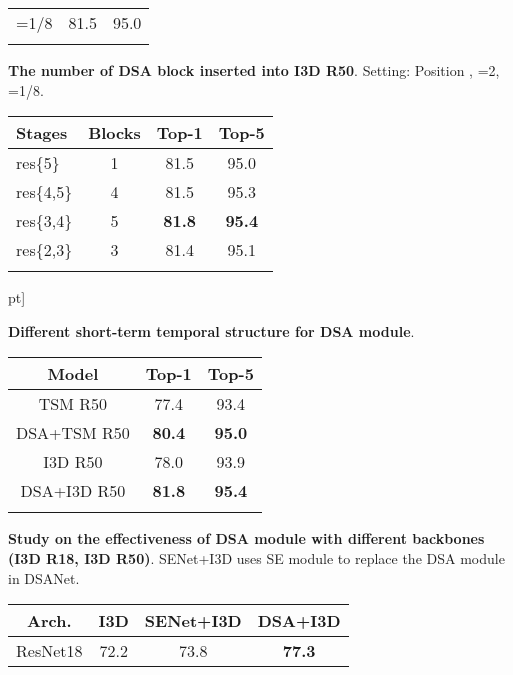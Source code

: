 \documentclass[sigconf]{acmart}
\newcommand{\RNum}[1]{\uppercase\expandafter{\romannumeral #1\relax}}
\begin{document}
{{\begin{subtable}[th]{0.23\textwidth}
\begin{tabular}{l|cc}
				=1/8  & 81.5 & 95.0 \\ \shline
			\end{tabular}
			\label{tab:ablation:beta}
		\end{subtable}		
		\hspace{2mm}
		\begin{subtable}[th]{0.24\textwidth}
		\centering
			\caption{\textbf{The number of DSA block inserted into I3D R50}. Setting: Position \RNum{2}, =2, =1/8.}		
\setlength{\tabcolsep}{2.0pt}
\begin{tabular}{l|c|cc}
			\shline
			Stages & Blocks  & Top-1       & Top-5     \\ \hline
				res\{5\} & 1 & 81.5 & 95.0  \\
				res\{4,5\} & 4 & 81.5 & 95.3   \\
				res\{3,4\} & 5 & \textbf{81.8} & \textbf{95.4}  \\
				res\{2,3\} & 3 & 81.4 & 95.1  \\ \shline
			\end{tabular}
			\label{tab:ablation:multi-stage}
		\end{subtable}	
		\7pt]
		\begin{subtable}[th]{0.29\textwidth}
		\centering
			\caption{\textbf{Different short-term temporal structure for DSA module}.}		
\begin{tabular}{c|cc}
			\shline
			Model   & Top-1       & Top-5     \\ \hline
			    TSM R50 &  77.4 & 93.4  \\
			    DSA+TSM R50  & \textbf{80.4} & \textbf{95.0}   \\  \hline
			    I3D R50 &  78.0 & 93.9  \\
				DSA+I3D R50  & \textbf{81.8} & \textbf{95.4}  \\ \shline
			\end{tabular}
			\label{tab:ablation:short-term}
		\end{subtable}			
		\hspace{3mm}
	    \begin{subtable}[th]{0.33\textwidth}
	    \centering
            \caption{\textbf{Study on the effectiveness of DSA module with different backbones (I3D R18, I3D R50)}. SENet+I3D uses SE module to replace the DSA module in DSANet.}	    
\begin{tabular}{c|ccc}
            \shline
            Arch.  & I3D & SENet+I3D & DSA+I3D\\
            \hline
            {ResNet18} &  72.2 & 73.8 & \textbf{77.3} \\

\end{tabular}
\end{subtable}}}
\end{document}
